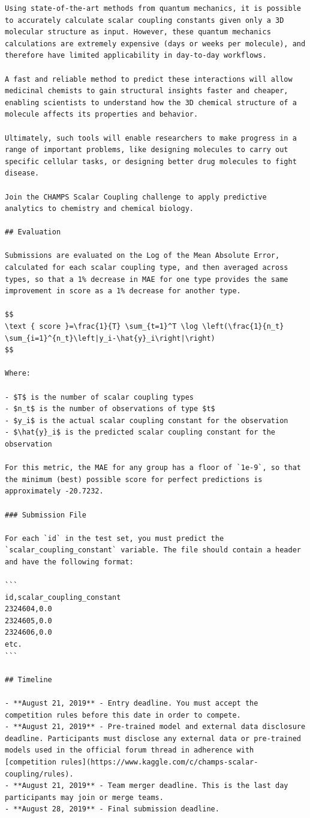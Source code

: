 \documentclass{article} %
\begin{document}
\begin{tcolorbox}[colback=lightgray!10, colframe=black, width=\textwidth, arc=2mm, boxrule=0.5mm, title=The original description for champs-scalar-coupling, breakable]
\begin{lstlisting}[basicstyle=\tiny\ttfamily, breaklines=true]
Using state-of-the-art methods from quantum mechanics, it is possible to accurately calculate scalar coupling constants given only a 3D molecular structure as input. However, these quantum mechanics calculations are extremely expensive (days or weeks per molecule), and therefore have limited applicability in day-to-day workflows.

A fast and reliable method to predict these interactions will allow medicinal chemists to gain structural insights faster and cheaper, enabling scientists to understand how the 3D chemical structure of a molecule affects its properties and behavior.

Ultimately, such tools will enable researchers to make progress in a range of important problems, like designing molecules to carry out specific cellular tasks, or designing better drug molecules to fight disease.

Join the CHAMPS Scalar Coupling challenge to apply predictive analytics to chemistry and chemical biology.

## Evaluation

Submissions are evaluated on the Log of the Mean Absolute Error, calculated for each scalar coupling type, and then averaged across types, so that a 1% decrease in MAE for one type provides the same improvement in score as a 1% decrease for another type.

$$
\text { score }=\frac{1}{T} \sum_{t=1}^T \log \left(\frac{1}{n_t} \sum_{i=1}^{n_t}\left|y_i-\hat{y}_i\right|\right)
$$

Where:

- $T$ is the number of scalar coupling types
- $n_t$ is the number of observations of type $t$
- $y_i$ is the actual scalar coupling constant for the observation
- $\hat{y}_i$ is the predicted scalar coupling constant for the observation

For this metric, the MAE for any group has a floor of `1e-9`, so that the minimum (best) possible score for perfect predictions is approximately -20.7232.

### Submission File

For each `id` in the test set, you must predict the `scalar_coupling_constant` variable. The file should contain a header and have the following format:

```
id,scalar_coupling_constant
2324604,0.0
2324605,0.0
2324606,0.0
etc.
```

## Timeline

- **August 21, 2019** - Entry deadline. You must accept the competition rules before this date in order to compete.
- **August 21, 2019** - Pre-trained model and external data disclosure deadline. Participants must disclose any external data or pre-trained models used in the official forum thread in adherence with [competition rules](https://www.kaggle.com/c/champs-scalar-coupling/rules).
- **August 21, 2019** - Team merger deadline. This is the last day participants may join or merge teams.
- **August 28, 2019** - Final submission deadline.


\end{lstlisting}
\end{tcolorbox}
\end{document}
